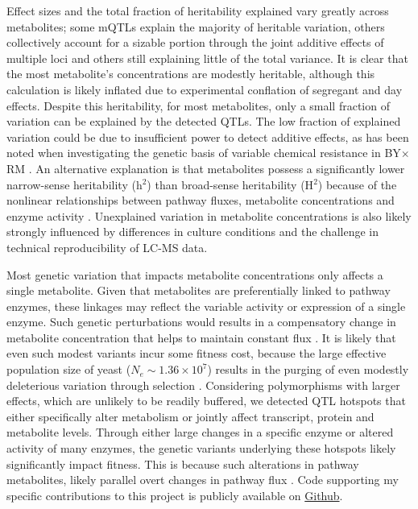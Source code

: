 Effect sizes and the total fraction of heritability explained vary greatly across metabolites; some mQTLs explain the majority of heritable variation, others collectively account for a sizable portion through the joint additive effects of multiple loci and others still explaining little of the total variance.  It is clear that the most metabolite's concentrations are modestly heritable, although this calculation is likely inflated due to experimental conflation of segregant and day effects.  Despite this heritability, for most metabolites, only a small fraction of variation can be explained by the detected QTLs.  The low fraction of explained variation could be due to insufficient power to detect additive effects, as has been noted when investigating the genetic basis of variable chemical resistance in BY$\times$RM \cite{Bloom:2013bq}.  An alternative explanation is that metabolites possess a significantly lower narrow-sense heritability (h$^{2}$) than broad-sense heritability (H$^{2}$) because of the nonlinear relationships between pathway fluxes, metabolite concentrations and enzyme activity \cite{Kacser:1973fe, Rowe:2008ty}. Unexplained variation in metabolite concentrations is also likely strongly influenced by differences in culture conditions and the challenge in technical reproducibility of LC-MS data. 

Most genetic variation that impacts metabolite concentrations only affects a single metabolite.  Given that metabolites are preferentially linked to pathway enzymes, these linkages may reflect the variable activity or expression of a single enzyme. Such genetic perturbations would results in a compensatory change in metabolite concentration that helps to maintain constant flux \cite{Fendt:2010gr}. It is likely that even such modest variants incur some fitness cost, because the large effective population size of yeast ($N_{e} \sim 1.36 \times 10^{7}$) results in the purging of even modestly deleterious variation through selection \cite{Hartl:2007fy,Ohta:1973ub,Wagner:2005cn}. Considering polymorphisms with larger effects, which are unlikely to be readily buffered, we detected QTL hotspots that either specifically alter metabolism or jointly affect transcript, protein and metabolite levels.  Through either large changes in a specific enzyme or altered activity of many enzymes, the genetic variants underlying these hotspots likely significantly impact fitness. This is because such alterations in pathway metabolites, likely parallel overt changes in pathway flux \cite{Dykhuizen:1987uq}. Code supporting my specific contributions to this project is publicly available on \href{https://github.com/shackett/mQTL}{Github}.

